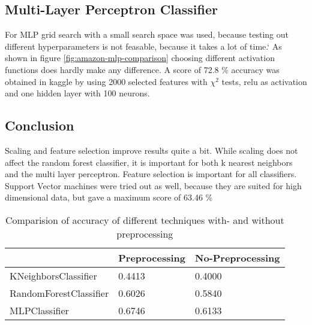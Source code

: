 \subsection{Multi-Layer Perceptron Classifier}

For MLP grid search with a small search space was used, because testing out different hyperparameters is not feasable, because it takes a lot of time.`
As shown in figure \ref{fig:amazon-mlp-comparison} choosing different activation functions does hardly make any difference.
A score of 72.8 \% accuracy was obtained in kaggle by using 2000 selected features with ${\chi}^2$ tests, relu as activation and one hidden layer with 100 neurons.



\subsection{Conclusion}

Scaling and feature selection improve results quite a bit. While scaling does not affect the random forest classifier, it is important for both k nearest neighbors and the multi layer perceptron. Feature selection is important for all classifiers. Support Vector machines were tried out as well, because they are suited for high dimensional data, but gave a maximum score of 63.46 \%

\begin{table}[ht]
\begin{center}
\begin{tabular}{|l|l|l|}
\hline
                       & Preprocessing & No-Preprocessing \\ \hline
KNeighborsClassifier   & 0.4413        & 0.4000           \\ \hline
RandomForestClassifier & 0.6026        & 0.5840           \\ \hline
MLPClassifier          & 0.6746        & 0.6133           \\ \hline
\end{tabular}
\caption{Comparision of accuracy of different techniques with- and without preprocessing}
\end{center}
\end{table}

